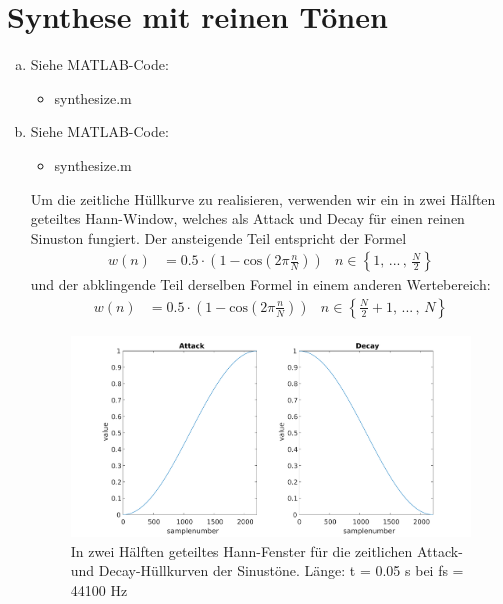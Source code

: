 \chapter{Synthese mit reinen Tönen}


\begin{enumerate}[a)]
\item Siehe MATLAB-Code:
\begin{itemize}
\item
synthesize.m
\end{itemize}
\item
Siehe MATLAB-Code:
\begin{itemize}
\item
synthesize.m
\end{itemize}
\vspace{\baselineskip}
Um die zeitliche Hüllkurve zu realisieren, verwenden wir ein in zwei Hälften geteiltes Hann-Window, welches als Attack und Decay für einen reinen Sinuston fungiert. Der ansteigende Teil entspricht der Formel
\begin{align*}
w(n) &= 0.5 \cdot (1- \mathrm{cos}(2 \pi \frac{n}{N})) & n \in \left\{1,\,...\,,\,\frac{N}{2}\right\}
\end{align*}
und der abklingende Teil derselben Formel in einem anderen Wertebereich:
\begin{align*}
w(n) &= 0.5 \cdot (1- \mathrm{cos}(2 \pi \frac{n}{N})) & n \in \left\{\frac{N}{2}+1,\,...\,,\,N\right\}
\end{align*}
\begin{figure}
  \centering
      \includegraphics[width=\textwidth]{Figures/envelopeplot}
 \caption{In zwei Hälften geteiltes Hann-Fenster für die zeitlichen Attack- und Decay-Hüllkurven der Sinustöne. Länge: t = 0.05 s bei fs = 44100 Hz}
	\label{fig:env}
\end{figure}
\end{enumerate}
